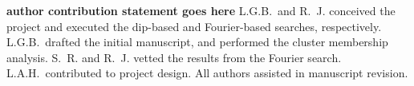 \documentclass[11pt,twocolumn,tighten]{aastex63}
\begin{document}
{\bf author contribution statement goes here}
L.G.B.~and R.~J. conceived the project and executed the
dip-based and Fourier-based searches, respectively.
L.G.B.~drafted the initial manuscript, and performed the cluster
membership analysis.
S.~R. and R.~J. vetted the results from the Fourier search.
L.A.H.~contributed to project design.
All authors assisted in manuscript revision.


\ 
\end{document}
